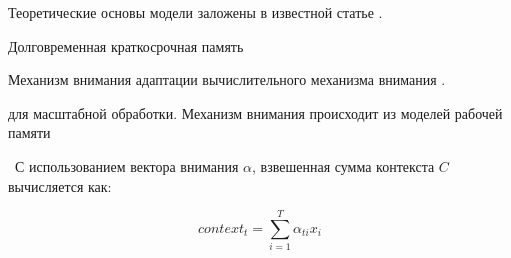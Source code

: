 Теоретические основы модели заложены в известной статье \cite{atkinson1968human}.


\texit{} Долговременная краткосрочная память



Механизм внимания адаптации вычислительного механизма
внимания \cite{bahdanau2014neural}.



для масштабной обработки. Механизм внимания происходит из моделей
рабочей памяти \cite{wallace1960plans}

\
С использованием вектора внимания $\alpha$, взвешенная сумма контекста $C$ вычисляется как:

\[ context_t = \sum_{i=1}^{T} \alpha_{ti} x_i \]